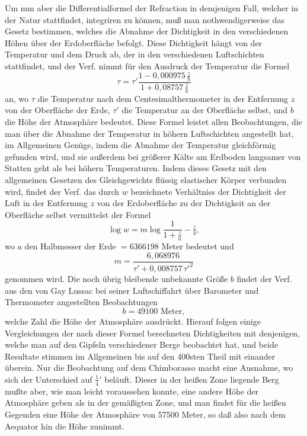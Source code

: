 \documentclass[12pt,a4paper]{article}
\theoremstyle{plain}
\theoremstyle{definition}
\theoremstyle{remark}
\begin{document}
Um nun aber die Differentialformel der Refraction in demjenigen Fall, welcher in der Natur stattfindet, integriren zu k\"onnen, mu\ss{} man nothwendigerweise das Gesetz bestimmen, welches die Abnahme der Dichtigkeit in den verschiedenen H\"ohen \"uber der Erdoberfl\"ache befolgt. Diese Dichtigkeit h\"angt von der Temperatur und dem Druck ab, der in den verschiedenen Luftschichten stattfindet, und der Verf. nimmt f\"ur den Ausdruck der Temperatur die Formel
\[
\tau = \tau'\frac{1 - 0{,}000975\,\tfrac{z}{b}}{1 + 0{,}08757\,\tfrac{z}{b}}
\]
an, wo $\tau$ die Temperatur nach dem Centesimalthermometer in der Entfernung $z$ von der Oberfl\"ache der Erde, $\tau'$ die Temperatur an der Oberfl\"ache selbst, und $b$ die H\"ohe der Atmosph\"are bedeutet. Diese Formel leistet allen Beobachtungen, die man \"uber die Abnahme der Temperatur in h\"ohern Luftschichten angestellt hat, im Allgemeinen Gen\"uge, indem die Abnahme der Temperatur gleichf\"ormig gefunden wird, und sie au\ss erdem bei gr\"o\ss erer K\"alte am Erdboden langsamer von Statten geht als bei h\"ohern Temperaturen. Indem dieses Gesetz mit den allgemeinen Gesetzen des Gleichgewichts fl\"ussig elastischer K\"orper verbunden wird, findet der Verf. das durch $w$ bezeichnete Verh\"altniss der Dichtigkeit der Luft in der Entfernung $z$ von der Erdoberfl\"ache zu der Dichtigkeit an der Oberfl\"ache selbst vermittelst der Formel
\[
\log w = m\log\frac{1}{1 + \tfrac{z}{a}} - \tfrac{z}{b},
\]
wo $a$ den Halbmesser der Erde $= 6366198$ Meter bedeutet und
\[
m = \frac{6{,}068976}{\tau' + 0{,}008757\,\tau'^2}
\]
genommen wird. Die noch \"ubrig bleibende unbekannte Gr\"o\ss e $b$ findet der Verf. aus den von Gay Lussac bei seiner Luftschiffahrt \"uber Barometer und Thermometer angestellten Beobachtungen
\[
b = 49100 \text{ Meter},
\]
welche Zahl die H\"ohe der Atmosph\"are ausdr\"uckt. Hierauf folgen einige Vergleichungen der nach dieser Formel berechneten Dichtigkeiten mit denjenigen, welche man auf den Gipfeln verschiedener Berge beobachtet hat, und beide Resultate stimmen im Allgemeinen bis auf den 400sten Theil mit einander \"uberein. Nur die Beobachtung auf dem Chimborasso macht eine Ausnahme, wo sich der Unterschied auf $\tfrac{1}{4}'$ bel\"auft. Dieser in der hei\ss en Zone liegende Berg mu\ss te aber, wie man leicht voraussehen konnte, eine andere H\"ohe der Atmosph\"are geben als in der gem\"a\ss igten Zone, und man findet f\"ur die hei\ss en Gegenden eine H\"ohe der Atmosph\"are von 57500 Meter, so da\ss{} also nach dem Aequator hin die H\"ohe zunimmt.

\newpage
\end{document}
